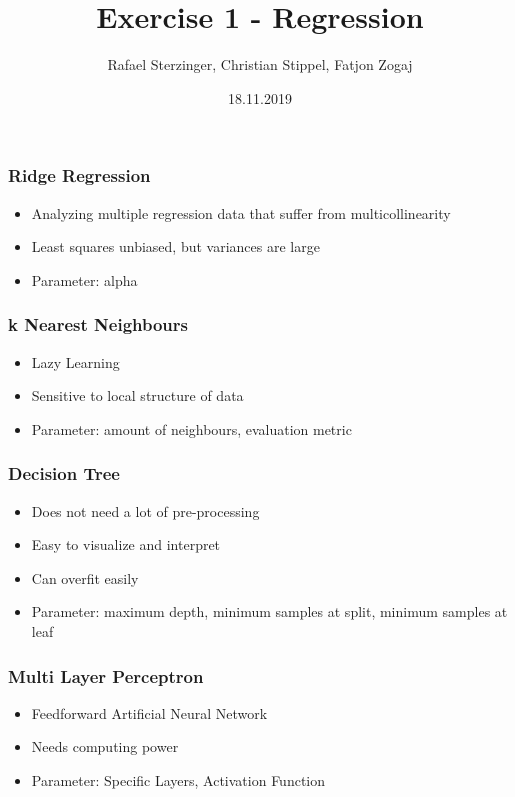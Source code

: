 \documentclass[aspectratio=169]{beamer}
\title[Your Short Title]{Exercise 1 - Regression}
\author{Rafael Sterzinger, Christian Stippel, Fatjon Zogaj}
\institute{Machine Learning}
\date{18.11.2019}
\begin{document}

\begin{frame}
  \titlepage
\end{frame}

\begin{frame}{}
\frametitle{Ridge Regression}
\begin{itemize}
    \item Analyzing multiple regression data that suffer from multicollinearity
    \item Least squares unbiased, but variances are large
    \item Parameter: alpha
\end{itemize}
\end{frame}

\begin{frame}{}
\frametitle{k Nearest Neighbours}
\begin{itemize}
    \item Lazy Learning
    \item Sensitive to local structure of data
    \item Parameter: amount of neighbours, evaluation metric
\end{itemize}
\end{frame}

\begin{frame}{}
\frametitle{Decision Tree}
\begin{itemize}
    \item Does not need a lot of pre-processing
    \item Easy to visualize and interpret
    \item Can overfit easily
    \item Parameter: maximum depth, minimum samples at split, minimum samples at leaf
\end{itemize}
\end{frame}

\begin{frame}{}
\frametitle{Multi Layer Perceptron}
\begin{itemize}
    \item Feedforward Artificial Neural Network
    \item Needs computing power
    \item Parameter: Specific Layers, Activation Function
\end{itemize}
\end{frame}
\end{document}
